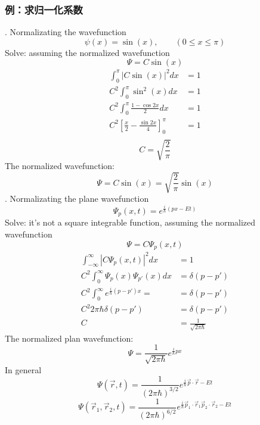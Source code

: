 \begin{frame}[allowframebreaks=]
    \frametitle{例：求归一化系数}
    . Normalizating the wavefunction \[\psi(x)=\sin(x), \qquad (0\le x \le \pi)\]
    \alert{Solve:} assuming the normalized wavefunction 
    \[\Psi=C\sin(x)\]
    \begin{equation*}
        \begin{split}
            \int_0 ^\pi |C\sin(x)|^2 dx &=1 \\
            C^2 \int_0 ^\pi \sin^2(x) dx &=1 \\
            C^2 \int_0 ^\pi \frac{1-\cos 2x }{2} dx &=1 \\ 
            C^2 [\frac{x}{2}-\frac{\sin 2x}{4}]_0 ^\pi &=1 \\ 
        \end{split} 
     \end{equation*}
     \[C=\sqrt{\frac{2}{\pi}}\]
     The normalized wavefunction:
     \begin{equation*}
        \Psi=C\sin(x)=\sqrt{\frac{2}{\pi}}\sin(x)
    \end{equation*}
    . Normalizating the plane wavefunction \[\Psi_p (x,t)=e^{\frac{i}{\hbar}(px-Et)} \] 
    \alert{Solve:} it's not a square integrable function, assuming the normalized wavefunction 
    \[\Psi=C\Psi_p (x,t)\]
    \begin{equation*}
        \begin{split}
            \int_{-\infty} ^\infty |C\Psi_p (x,t)|^2 dx &=1  \\
            C^2 \int_0 ^\infty \Psi_p (x) \Psi_{p'} (x) dx &=\delta (p-p')  \\
            C^2 \int_0 ^\infty e^{\frac{i}{\hbar}(p-p')x} =&=\delta (p-p')\\
            C^2 2\pi \hbar \delta (p-p') &=\delta(p-p') \\
            C&= \frac{1}{\sqrt{2\pi \hbar}}
        \end{split} 
     \end{equation*}
     The normalized plan wavefunction:
     \begin{equation*}
        \Psi=\frac{1}{\sqrt{2\pi \hbar}} e^{\frac{i}{\hbar}px}
    \end{equation*}  
    In general
    $$ \Psi(\vec r ,t)=\frac{1}{(2\pi \hbar)^{3/2}} e^{\frac{i}{\hbar}\vec p\cdot \vec r -Et} $$
    $$ \Psi(\vec r_1 ,\vec r_2, t)=\frac{1}{(2\pi \hbar)^{6/2}} e^{\frac{i}{\hbar}\vec p_1 \cdot \vec r_1 \vec p_2 \cdot \vec r_2 -Et} $$
\end{frame}

